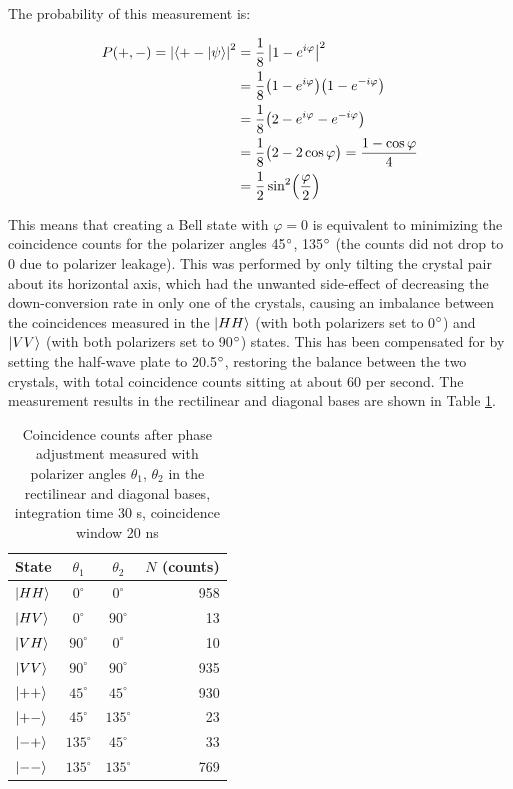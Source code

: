 \documentclass[a4paper,
DIV=13,
12pt,
BCOR=10mm,
department=FakEI,
twoside,
parskip=half,
automark,
logostyle=flat,
]{OTHRartcl}
\begin{document}
The probability of this measurement is:

\begin{equation}
    \begin{split}
        P(+,-) = \left| \braket{+-|\psi} \right|^{2}
            &= \frac{1}{8} \left| 1 - e^{i\varphi} \right|^{2} \\
            &= \frac{1}{8} \bigl( 1 - e^{i\varphi} \bigr)\bigl( 1 - e^{-i\varphi} \bigr) \\
            &= \frac{1}{8} \bigl( 2 - e^{i\varphi} - e^{-i\varphi} \bigr) \\
            &= \frac{1}{8} \bigl( 2 - 2\cos\varphi \bigr)
            = \frac{1 - \cos\varphi}{4} \\
            &= \frac{1}{2} \sin^{2}\!\left( \frac{\varphi}{2} \right)
    \end{split}
    \label{projection_pm_probability}
\end{equation}

This means that creating a Bell state with $\varphi = 0$ is equivalent to minimizing the coincidence counts for the polarizer angles 45$\degree$, 135$\degree$ (the counts did not drop to 0 due to polarizer leakage). This was performed by only tilting the crystal pair about its horizontal axis, which had the unwanted side-effect of decreasing the down-conversion rate in only one of the crystals, causing an imbalance between the coincidences measured in the $\ket{HH}$ (with both polarizers set to 0$\degree$) and $\ket{VV}$ (with both polarizers set to 90$\degree$) states. This has been compensated for by setting the half-wave plate to 20.5$\degree$, restoring the balance between the two crystals, with total coincidence counts sitting at about 60 per second. The measurement results in the rectilinear and diagonal bases are shown in Table \ref{tab:bases_measurements}.

\begin{table}[htbp]
  \centering
  \begin{tabular}{l c c r}
    \toprule
    State & $\theta_1$ & $\theta_2$ & $N$ (counts) \\
    \midrule
    $\ket{HH}$ & $0^\circ$  & $0^\circ$  & 958 \\
    $\ket{HV}$ & $0^\circ$  & $90^\circ$ &  13 \\
    $\ket{VH}$ & $90^\circ$ & $0^\circ$  &  10 \\
    $\ket{VV}$ & $90^\circ$ & $90^\circ$ & 935 \\
    \midrule
    $\ket{++}$ & $45^\circ$  & $45^\circ$  & 930 \\
    $\ket{+-}$ & $45^\circ$  & $135^\circ$ &  23 \\
    $\ket{-+}$ & $135^\circ$ & $45^\circ$  &  33 \\
    $\ket{--}$ & $135^\circ$ & $135^\circ$ & 769 \\
    \bottomrule
  \end{tabular}
  \caption{Coincidence counts after phase adjustment measured with polarizer angles $\theta_1$, $\theta_2$ in the rectilinear and diagonal bases, integration time 30 s, coincidence window 20 ns}
  \label{tab:bases_measurements}
\end{table}
\end{document}
